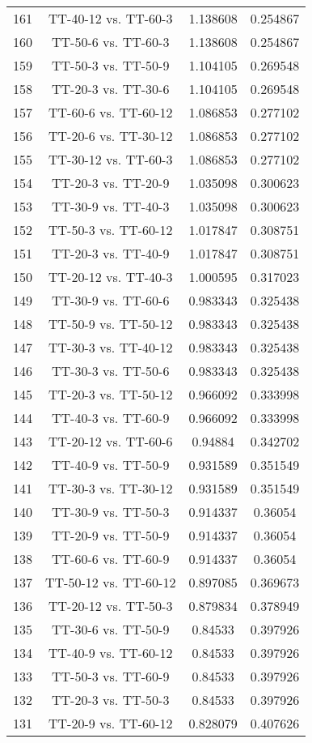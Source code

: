 \documentclass[a4paper,10pt]{article}
\begin{document}
\begin{landscape}
\begin{table}[!htp]
\begin{tabular}{cccc}
161&TT-40-12 vs. TT-60-3&1.138608&0.254867\\
160&TT-50-6 vs. TT-60-3&1.138608&0.254867\\
159&TT-50-3 vs. TT-50-9&1.104105&0.269548\\
158&TT-20-3 vs. TT-30-6&1.104105&0.269548\\
157&TT-60-6 vs. TT-60-12&1.086853&0.277102\\
156&TT-20-6 vs. TT-30-12&1.086853&0.277102\\
155&TT-30-12 vs. TT-60-3&1.086853&0.277102\\
154&TT-20-3 vs. TT-20-9&1.035098&0.300623\\
153&TT-30-9 vs. TT-40-3&1.035098&0.300623\\
152&TT-50-3 vs. TT-60-12&1.017847&0.308751\\
151&TT-20-3 vs. TT-40-9&1.017847&0.308751\\
150&TT-20-12 vs. TT-40-3&1.000595&0.317023\\
149&TT-30-9 vs. TT-60-6&0.983343&0.325438\\
148&TT-50-9 vs. TT-50-12&0.983343&0.325438\\
147&TT-30-3 vs. TT-40-12&0.983343&0.325438\\
146&TT-30-3 vs. TT-50-6&0.983343&0.325438\\
145&TT-20-3 vs. TT-50-12&0.966092&0.333998\\
144&TT-40-3 vs. TT-60-9&0.966092&0.333998\\
143&TT-20-12 vs. TT-60-6&0.94884&0.342702\\
142&TT-40-9 vs. TT-50-9&0.931589&0.351549\\
141&TT-30-3 vs. TT-30-12&0.931589&0.351549\\
140&TT-30-9 vs. TT-50-3&0.914337&0.36054\\
139&TT-20-9 vs. TT-50-9&0.914337&0.36054\\
138&TT-60-6 vs. TT-60-9&0.914337&0.36054\\
137&TT-50-12 vs. TT-60-12&0.897085&0.369673\\
136&TT-20-12 vs. TT-50-3&0.879834&0.378949\\
135&TT-30-6 vs. TT-50-9&0.84533&0.397926\\
134&TT-40-9 vs. TT-60-12&0.84533&0.397926\\
133&TT-50-3 vs. TT-60-9&0.84533&0.397926\\
132&TT-20-3 vs. TT-50-3&0.84533&0.397926\\
131&TT-20-9 vs. TT-60-12&0.828079&0.407626\\

\end{tabular}
\end{table}
\end{landscape}
\end{document}
